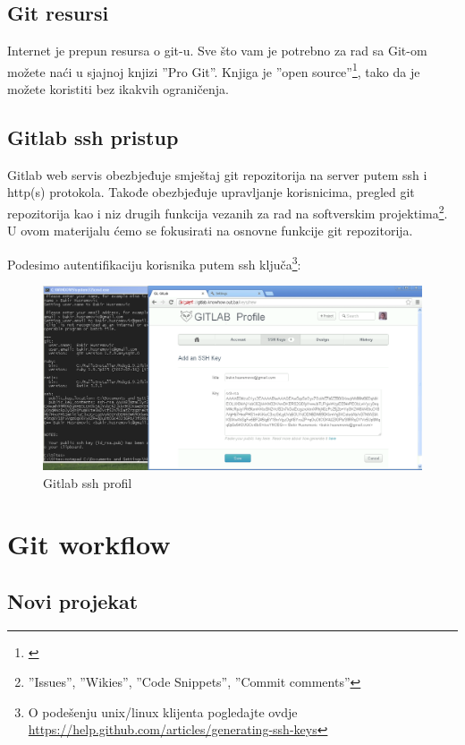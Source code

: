 \documentclass[times, utf8, seminar]{fit}
\begin{document}
\section{Git resursi}

Internet je prepun resursa o git-u. Sve što vam je potrebno za rad sa Git-om možete naći u sjajnoj knjizi ''Pro Git''\citep{progit}. Knjiga je ''open source''\footnote{\href{https://github.s3.amazonaws.com/media/progit.en.pdf}{\color{blue}{PDF download}}}, tako da je možete koristiti bez ikakvih ograničenja.

\section{Gitlab ssh pristup}

Gitlab web servis obezbjeđuje smještaj git repozitorija na server putem ssh i http(s) protokola.
Takođe obezbjeđuje upravljanje korisnicima, pregled git repozitorija kao i niz drugih funkcija vezanih za rad na softverskim projektima\footnote{ ''Issues'', ''Wikies'', ''Code Snippets'', ''Commit comments''}.
U ovom materijalu ćemo se fokusirati na osnovne funkcije git repozitorija.

Podesimo autentifikaciju korisnika putem ssh ključa\footnote{O podešenju unix/linux klijenta pogledajte ovdje \url{https://help.github.com/articles/generating-ssh-keys}}:

\begin{figure}[H]
\centering
\includegraphics[width=15cm]{img/gitlab_ssh_profile.png}
\caption{Gitlab ssh profil}
\end{figure}

\chapter{Git workflow}

\section{Novi projekat}
\end{document}
